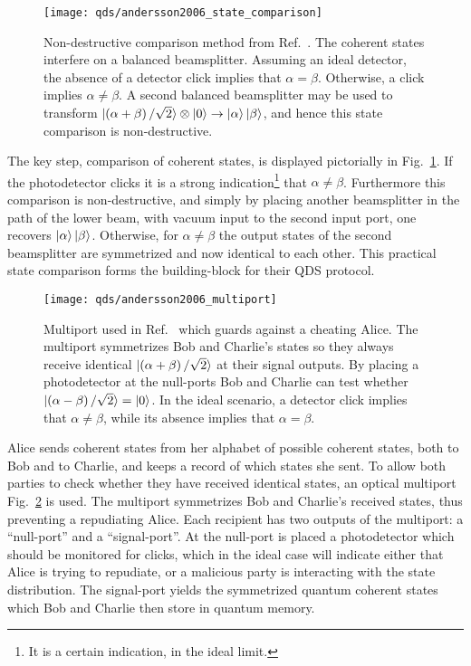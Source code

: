 \begin{figure}[htp]
\captionsetup{width=0.8\linewidth}
\centering
\texttt{[image: qds/andersson2006\_state\_comparison]}
\caption{\label{fig:andersson2006_state_comparison} Non-destructive comparison method from Ref.~\cite{Andersson2006}. The coherent states interfere on a balanced beamsplitter. Assuming an ideal detector, the absence of a detector click implies that $\alpha = \beta$. Otherwise, a click implies $\alpha \ne \beta$. A second balanced beamsplitter may be used to transform $\ket{\left(\alpha+\beta\right)/\sqrt{2}}\otimes\ket{0}\rightarrow\ket{\alpha}\ket{\beta}$, and hence this state comparison is non-destructive.}
\end{figure}

The key step, comparison of coherent states, is displayed pictorially in Fig.~\ref{fig:andersson2006_state_comparison}. If the photodetector clicks it is a strong indication\footnote{It is a certain indication, in the ideal limit.} that $\alpha \ne \beta$. Furthermore this comparison is non-destructive, and simply by placing another beamsplitter in the path of the lower beam, with vacuum input to the second input port, one recovers $\ket{\alpha}\ket{\beta}$. Otherwise, for $\alpha \ne \beta$ the output states of the second beamsplitter are symmetrized and now identical to each other. This practical state comparison forms the building-block for their QDS protocol. 

\begin{figure}[htp]
\captionsetup{width=0.8\linewidth}
\centering
\texttt{[image: qds/andersson2006\_multiport]}
\caption{\label{fig:andersson2006_multiport} Multiport used in Ref.~\cite{Andersson2006} which guards against a cheating Alice. The multiport symmetrizes Bob and Charlie's states so they always receive identical $\ket{\left(\alpha+\beta\right)/\sqrt{2}}$ at their signal outputs. By placing a photodetector at the null-ports Bob and Charlie can test whether $\ket{\left(\alpha-\beta\right)/\sqrt{2}} = \ket{0}$. In the ideal scenario, a detector click implies that $\alpha\ne\beta$, while its absence implies that $\alpha = \beta$. }
\end{figure}

Alice sends coherent states from her alphabet of possible coherent states, both to Bob and to Charlie, and keeps a record of which states she sent. To allow both parties to check whether they have received identical states, an optical multiport Fig.~\ref{fig:andersson2006_multiport} is used. The multiport symmetrizes Bob and Charlie's received states, thus preventing a repudiating Alice. Each recipient has two outputs of the multiport: a ``null-port'' and a ``signal-port''. At the null-port is placed a photodetector which should be monitored for clicks, which in the ideal case will indicate either that Alice is trying to repudiate, or a malicious party is interacting with the state distribution. The signal-port yields the symmetrized quantum coherent states which Bob and Charlie then store in quantum memory.

